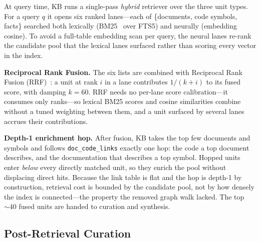 At query time, KB runs a single-pass \emph{hybrid} retriever over the three unit
types.  For a query $q$ it opens six ranked lanes---each of
\{documents, code symbols, facts\} searched both lexically (BM25~\cite{robertson2009bm25}
over FTS5) and neurally (embedding cosine).  To avoid a full-table embedding scan
per query, the neural lanes re-rank the candidate pool that the lexical lanes
surfaced rather than scoring every vector in the index.

\medskip
\noindent\textbf{Reciprocal Rank Fusion.}  The six lists are combined with
Reciprocal Rank Fusion (RRF)~\cite{cormack2009rrf}: a unit at rank $i$ in a lane
contributes $1/(k + i)$ to its fused score, with damping $k = 60$.  RRF needs no
per-lane score calibration---it consumes only ranks---so lexical BM25 scores and
cosine similarities combine without a tuned weighting between them, and a unit
surfaced by several lanes accrues their contributions.

\medskip
\noindent\textbf{Depth-1 enrichment hop.}  After fusion, KB takes the top few
documents and symbols and follows \texttt{doc\_code\_links} exactly one hop: the
code a top document describes, and the documentation that describes a top symbol.
Hopped units enter \emph{below} every directly matched unit, so they enrich the
pool without displacing direct hits.  Because the link table is flat and the hop
is depth-1 by construction, retrieval cost is bounded by the candidate pool, not
by how densely the index is connected---the property the removed graph walk
lacked.  The top $\sim\!40$ fused units are handed to curation and synthesis.

\subsection{Post-Retrieval Curation}
\label{subsec:curation}


